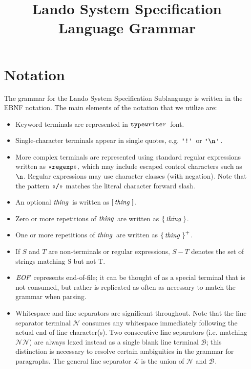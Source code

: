 \documentclass{article}
\newcommand{\gnn}{\ensuremath{\mathcal{N}}}
\newcommand{\gnl}{\ensuremath{\mathcal{L}}}
\newcommand{\gnb}{\ensuremath{\mathcal{B}}}
\begin{document}
\title{Lando System Specification Language Grammar}
\maketitle

\section{Notation}

The grammar for the Lando System Specification Sublanguage is written in the EBNF notation. The main elements of the notation that we utilize are:
\begin{itemize}
  \item Keyword terminals are represented in $\mathop{\texttt{typewriter}}\,$ font. 
  \item Single-character terminals appear in single quotes, e.g. $\gtkc{!}$ or $\gtkc{\gtesc{n}}$.
  \item More complex terminals are represented using standard regular expressions written as $\gtregex{regexp}$, which may include escaped control characters such as $\texttt{\textbackslash {n}}$. Regular expressions may use character classes (with negation). Note that the pattern $\gtregex{/}$ matches the literal character forward slash.
  \item An optional $\mathop{\textit{thing}}\,$ is written as $\mathop{\operatorname{[} \mathop{\mathop{\textit{thing}}\,} \operatorname{]}}$.
  \item {Zero or more repetitions of $\mathop{\textit{thing}}\,$ are written as $\mathop{\operatorname{\{} \mathop{\textit{thing}}\, \operatorname{\}}}$}.
  \item One or more repetitions of $\mathop{\textit{thing}}\,$ are written as $\mathop{\operatorname{\{} \mathop{\textit{thing}}\, \operatorname{\}}^+}$.
  \item If $S$ and $T$ are non-terminals or regular expressions, $S - T$ denotes the set of strings matching S but not T.
  \item $\mathop{\textit{EOF}}\,$ represents end-of-file; it can be thought of as a special terminal that is not consumed, but rather is replicated as often as necessary to match the grammar when parsing.
  \item Whitespace and line separators are significant throughout. Note that the line separator terminal $\gnn$ consumes any whitespace immediately following the actual end-of-line character(s). Two consecutive line separators (i.e. matching $\gnn\gnn$) are always lexed instead as a single blank line terminal $\gnb$;
    this distinction is necessary to resolve certain ambiguities in the grammar for paragraphs.
    The general line separator $\gnl$ is the union of $\gnn$ and $\gnb$.
\end{itemize}
\end{document}
